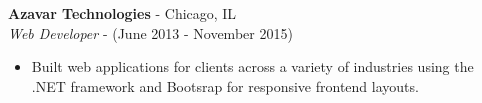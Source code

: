 \documentclass[10pt]{article}
\begin{document}
\begin{paracol}{2}
    \noindent \textbf{Azavar Technologies} - Chicago, IL \\
    \textit{Web Developer} - {\footnotesize(June 2013 - November 2015)}
    \begin{itemize}
        \item Built web applications for clients across a variety of industries using the .NET framework and Bootsrap for responsive frontend layouts.
    \end{itemize}

\end{paracol}
\end{document}
